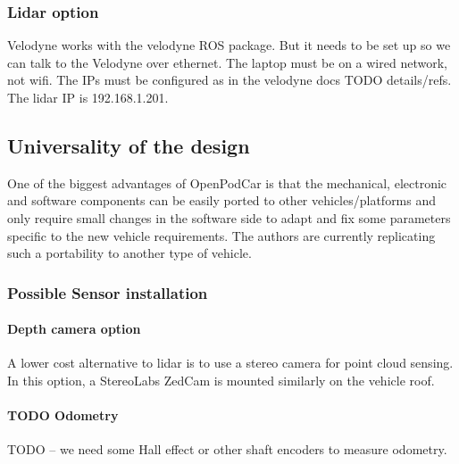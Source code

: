 \documentclass[a4paper]{article}
\begin{document}
\subsubsection{Lidar option}
Velodyne works with the velodyne ROS package. But it needs to be set up so we can talk to the Velodyne over ethernet.  The laptop must be on a wired network, not wifi.   The IPs must be configured as in the velodyne docs TODO details/refs.  The lidar IP is 192.168.1.201.


\subsection{Universality of the design}\label{h.q32f2nclh4e5}


One of the biggest advantages of OpenPodCar is that the mechanical, electronic and software components can be easily ported to other vehicles/platforms and only require small changes in the software side to adapt and fix some parameters specific to the new vehicle requirements. The authors are currently replicating such a portability to another type of vehicle. 

\subsubsection{Possible Sensor installation}

\paragraph{Depth camera option}
A lower cost alternative to lidar is to use a stereo camera for point cloud sensing. In this option, a StereoLabs ZedCam is mounted similarly on the vehicle roof.

\paragraph{TODO Odometry}
TODO -- we need some Hall effect or other shaft encoders to measure odometry.
\end{document}
